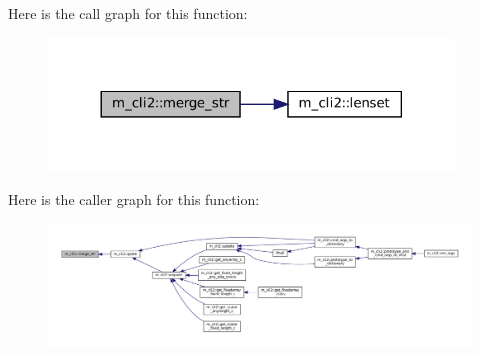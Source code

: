 Here is the call graph for this function\+:\nopagebreak
\begin{figure}[H]
\begin{center}
\leavevmode
\includegraphics[width=305pt]{namespacem__cli2_a8e172feb2e4ae4d21d4fceb4e54f593c_cgraph}
\end{center}
\end{figure}
Here is the caller graph for this function\+:\nopagebreak
\begin{figure}[H]
\begin{center}
\leavevmode
\includegraphics[width=350pt]{namespacem__cli2_a8e172feb2e4ae4d21d4fceb4e54f593c_icgraph}
\end{center}
\end{figure}
\mbox{\label{namespacem__cli2_a368e9aaa556f69228e7f0837bd558b82}} 
